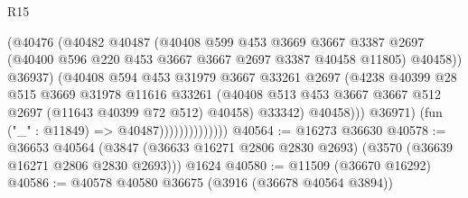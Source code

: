 \begin{lexlean}{R15}
\begin{coremodule}
                                    (@40476
                                      (@40482
                                        @40487
                                        (@40408
                                          @599
                                          @453
                                          @3669
                                          @3667
                                          @3387
                                          @2697
                                          (@40400
                                            @596
                                            @220
                                            @453
                                            @3667
                                            @3667
                                            @2697
                                            @3387
                                            @40458
                                            @11805)
                                          @40458))
                                      @36937)
                                    (@40408
                                      @594
                                      @453
                                      @31979
                                      @3667
                                      @33261
                                      @2697
                                      (@4238
                                        @40399
                                        @28
                                        @515
                                        @3669
                                        @31978
                                        @11616
                                        @33261
                                        (@40408
                                          @513
                                          @453
                                          @3667
                                          @3667
                                          @512
                                          @2697
                                          (@11643 @40399 @72 @512)
                                          @40458)
                                        @33342)
                                      @40458)))
                                @36971)
                              (fun ("_" : @11849) => @40487))))))))))))))
@40564 := @16273 @36630
@40578 := @36653
    @40564
    (@3847 (@36633 @16271 @2806 @2830 @2693) (@3570 (@36639 @16271 @2806 @2830 @2693)))
    @1624
@40580 := @11509 (@36670 @16292)
@40586 := @40578 @40580 @36675 (@3916 (@36678 @40564 @3894))

\end{coremodule}
\end{lexlean}
